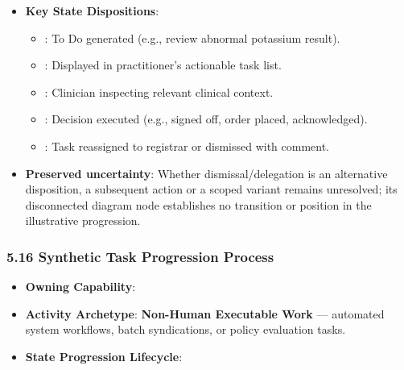 \begin{itemize}

\item 
\textbf{Key State Dispositions}:


\begin{itemize}

\item 
\texttt{}: To Do generated (e.g., review abnormal potassium result).



\item 
\texttt{}: Displayed in practitioner's actionable task list.



\item 
\texttt{}: Clinician inspecting relevant clinical context.



\item 
\texttt{}: Decision executed (e.g., signed off, order placed, acknowledged).



\item 
\texttt{}: Task reassigned to registrar or dismissed with comment.



\end{itemize}


\item 
\textbf{Preserved uncertainty}: Whether dismissal/\allowbreak{}delegation is an alternative disposition, a subsequent action or a scoped variant remains unresolved; its disconnected diagram node establishes no transition or position in the illustrative progression.



\end{itemize}
\label{rad:processes:320}

\par\smallskip
{}\label{rad:processes:322}
\subsubsection*{5.16 Synthetic Task Progression Process}
\label{rad:processes:323}

\begin{itemize}

\item 
\textbf{Owning Capability}: \texttt{}



\item 
\textbf{Activity Archetype}: \textbf{Non-Human Executable Work} — automated system workflows, batch syndications, or policy evaluation tasks.



\item 
\textbf{State Progression Lifecycle}:



\end{itemize}
\label{rad:processes:327}


